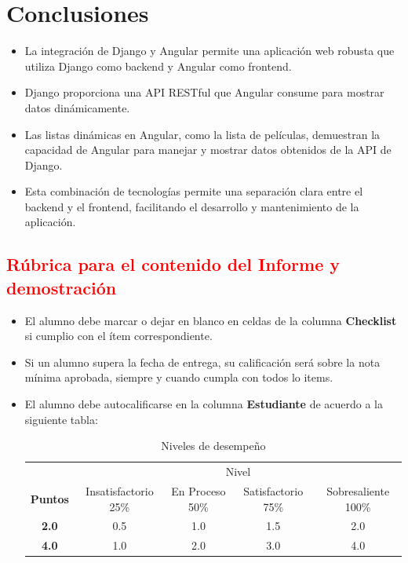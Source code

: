 \documentclass{article}
\begin{document}

  \section{Conclusiones}
  \begin{itemize}
    \item La integración de Django y Angular permite una aplicación web robusta que utiliza Django como backend 
    y Angular como frontend.
    \item Django proporciona una API RESTful que Angular consume para mostrar datos dinámicamente.
    \item Las listas dinámicas en Angular, como la lista de películas, demuestran la capacidad de Angular para manejar 
    y mostrar datos obtenidos de la API de Django.
    \item Esta combinación de tecnologías permite una separación clara entre el backend y el frontend, facilitando el 
    desarrollo y mantenimiento de la aplicación.
  \end{itemize}


	\newpage
	\subsection{\textcolor{red}{Rúbrica para el contenido del Informe y demostración}}
	\begin{itemize}			
		\item El alumno debe marcar o dejar en blanco en celdas de la columna \textbf{Checklist} si cumplio con el ítem correspondiente.
		\item Si un alumno supera la fecha de entrega,  su calificación será sobre la nota mínima aprobada, siempre y cuando cumpla con todos lo items.
		\item El alumno debe autocalificarse en la columna \textbf{Estudiante} de acuerdo a la siguiente tabla:
	
		\begin{table}[ht]
			\caption{Niveles de desempeño}
			\begin{center}
			\begin{tabular}{ccccc}
    			\hline
    			 & \multicolumn{4}{c}{Nivel}\\
    			\cline{1-5}
    			\textbf{Puntos} & Insatisfactorio 25\%& En Proceso 50\% & Satisfactorio 75\% & Sobresaliente 100\%\\
    			\textbf{2.0}&0.5&1.0&1.5&2.0\\
    			\textbf{4.0}&1.0&2.0&3.0&4.0\\
    		\hline
			\end{tabular}
		\end{center}
	\end{table}	
	

	\end{itemize}
\end{document}
